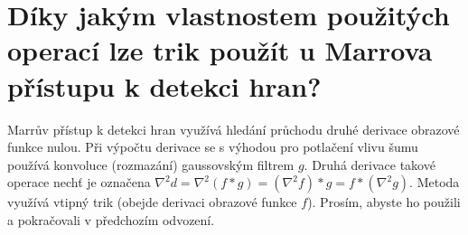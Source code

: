 \section{Díky jakým vlastnostem použitých operací lze trik použít u Marrova přístupu k detekci hran?}
Marrův přístup k detekci hran využívá hledání průchodu druhé derivace obrazové funkce nulou. Při výpočtu 
derivace se s výhodou pro potlačení vlivu šumu používá konvoluce (rozmazání) gaussovským filtrem 
$g$. Druhá derivace takové operace nechť je označena 
$\nabla^{2}d = \nabla^{2}(f*g) = (\nabla^{2}f)*g = f*(\nabla^{2}g)$. Metoda využívá vtipný trik (obejde derivaci 
obrazové funkce $f$). 
Prosím, abyste ho použili a pokračovali v předchozím odvození. 